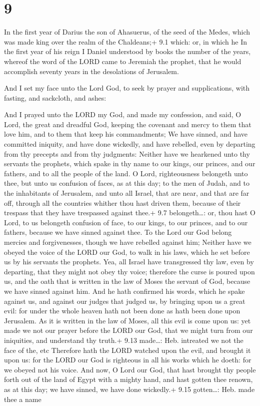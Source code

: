 \hypertarget{section-8}{%
\section{9}\label{section-8}}

 In the first year of Darius the son of Ahasuerus, of the
seed of the Medes, which was made king over the realm of the Chaldeans;+
9.1 which: or, in which he  In the first year of his reign I
Daniel understood by books the number of the years, whereof the word of
the LORD came to Jeremiah the prophet, that he would accomplish seventy
years in the desolations of Jerusalem.

 And I set my face unto the Lord God, to seek by prayer
and supplications, with fasting, and sackcloth, and ashes:

 And I prayed unto the LORD my God, and made my confession,
and said, O Lord, the great and dreadful God, keeping the covenant and
mercy to them that love him, and to them that keep his commandments;
 We have sinned, and have committed iniquity, and have done
wickedly, and have rebelled, even by departing from thy precepts and
from thy judgments:  Neither have we hearkened unto thy
servants the prophets, which spake in thy name to our kings, our
princes, and our fathers, and to all the people of the land.
 O Lord, righteousness belongeth unto thee, but unto us
confusion of faces, as at this day; to the men of Judah, and to the
inhabitants of Jerusalem, and unto all Israel, that are near, and that
are far off, through all the countries whither thou hast driven them,
because of their trespass that they have trespassed against thee.+ 9.7
belongeth\ldots: or, thou hast  O Lord, to us belongeth
confusion of face, to our kings, to our princes, and to our fathers,
because we have sinned against thee.  To the Lord our God
belong mercies and forgivenesses, though we have rebelled against him;
 Neither have we obeyed the voice of the LORD our God, to
walk in his laws, which he set before us by his servants the prophets.
 Yea, all Israel have transgressed thy law, even by
departing, that they might not obey thy voice; therefore the curse is
poured upon us, and the oath that is written in the law of Moses the
servant of God, because we have sinned against him.  And he
hath confirmed his words, which he spake against us, and against our
judges that judged us, by bringing upon us a great evil: for under the
whole heaven hath not been done as hath been done upon Jerusalem.
 As it is written in the law of Moses, all this evil is
come upon us: yet made we not our prayer before the LORD our God, that
we might turn from our iniquities, and understand thy truth.+ 9.13
made\ldots: Heb. intreated we not the face of the, etc 
Therefore hath the LORD watched upon the evil, and brought it upon us:
for the LORD our God is righteous in all his works which he doeth: for
we obeyed not his voice.  And now, O Lord our God, that
hast brought thy people forth out of the land of Egypt with a mighty
hand, and hast gotten thee renown, as at this day; we have sinned, we
have done wickedly.+ 9.15 gotten\ldots: Heb. made thee a name

